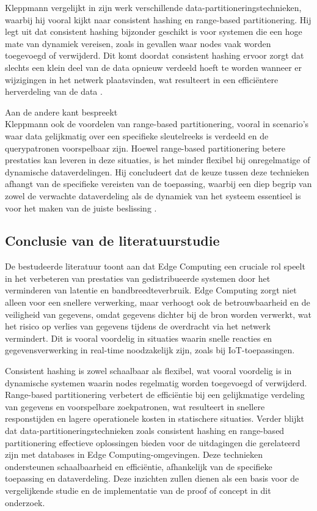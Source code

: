  
Kleppmann vergelijkt in zijn werk verschillende data-partitioneringstechnieken, waarbij hij vooral kijkt naar consistent hashing en range-based partitionering.
 Hij legt uit dat consistent hashing bijzonder geschikt is voor systemen die een hoge mate van dynamiek vereisen, zoals in gevallen waar nodes vaak worden toegevoegd of verwijderd.
Dit komt doordat consistent hashing ervoor zorgt dat slechts een klein deel van de data opnieuw verdeeld hoeft te worden wanneer er wijzigingen in het netwerk plaatsvinden, wat resulteert in een efficiëntere herverdeling van de data \autocite{Kleppmann2017}.

Aan de andere kant bespreekt \\Kleppmann \autocite{Kleppmann2017} ook de voordelen van range-based partitionering, vooral in scenario's waar data gelijkmatig over een specifieke sleutelreeks is verdeeld en de querypatronen voorspelbaar zijn.
 Hoewel range-based partitionering betere prestaties kan leveren in deze situaties, is het minder flexibel bij onregelmatige of dynamische dataverdelingen. 
Hij concludeert dat de keuze tussen deze technieken afhangt van de specifieke vereisten van de toepassing, waarbij een diep begrip van zowel de verwachte dataverdeling als de dynamiek van het systeem essentieel is voor het maken van de juiste beslissing \autocite{Kleppmann2017}.

\subsection{Conclusie van de literatuurstudie}
De bestudeerde literatuur toont aan dat Edge Computing een cruciale rol speelt in het verbeteren van prestaties van gedistribueerde systemen
 door het verminderen van latentie en bandbreedteverbruik.
 Edge Computing zorgt niet alleen voor een snellere verwerking, maar verhoogt ook de betrouwbaarheid en de veiligheid van gegevens, omdat gegevens dichter bij de bron worden verwerkt, wat het risico op verlies van gegevens tijdens de overdracht via het netwerk vermindert. Dit is vooral voordelig in situaties waarin snelle reacties en gegevensverwerking in real-time noodzakelijk zijn, zoals bij IoT-toepassingen.

Consistent hashing is zowel schaalbaar als flexibel,
 wat vooral voordelig is in dynamische systemen waarin nodes regelmatig worden toegevoegd of verwijderd.
Range-based partitionering verbetert de efficiëntie bij een gelijkmatige verdeling van gegevens en voorspelbare zoekpatronen,
 wat resulteert in snellere responstijden en lagere operationele kosten in statischere situaties.
Verder blijkt dat data-partitioneringstechnieken zoals consistent hashing en range-based partitionering effectieve oplossingen bieden
 voor de uitdagingen die gerelateerd zijn met databases in Edge Computing-omgevingen.
Deze technieken ondersteunen schaalbaarheid en efficiëntie, afhankelijk van de specifieke toepassing en dataverdeling.
Deze inzichten zullen dienen als een basis voor de vergelijkende studie en de implementatie van de proof of concept in dit onderzoek.

